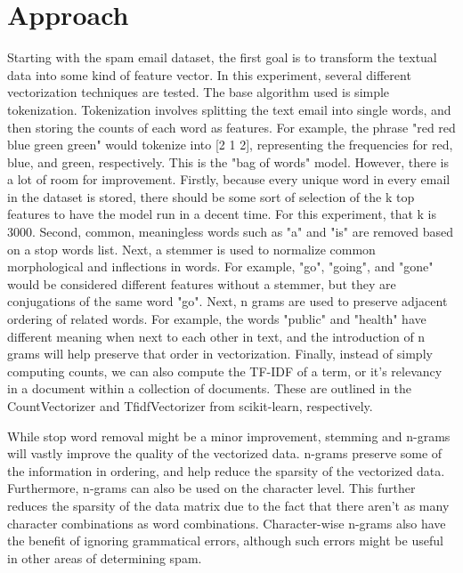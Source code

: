 \documentclass{article}
\begin{document}
\section{Approach}
\begin{paragraph}
Starting with the spam email dataset, the first goal is to transform the textual data into some kind of feature vector. In this experiment, several different vectorization techniques are tested. The base algorithm used is simple tokenization. Tokenization involves splitting the text email into single words, and then storing the counts of each word as features. For example, the phrase "red red blue green green" would tokenize into [2 1 2], representing the frequencies for red, blue, and green, respectively. This is the "bag of words" model. However, there is a lot of room for improvement. Firstly, because every unique word in every email in the dataset is stored, there should be some sort of selection of the k top features to have the model run in a decent time. For this experiment, that k is 3000. Second, common, meaningless words such as "a" and "is" are removed based on a stop words list. Next, a stemmer is used to normalize common morphological and inflections in words. For example, "go", "going", and "gone" would be considered different features without a stemmer, but they are conjugations of the same word "go". Next, n grams are used to preserve adjacent ordering of related words. For example, the words "public" and "health" have different meaning when next to each other in text, and the introduction of n grams will help preserve that order in vectorization. Finally, instead of simply computing counts, we can also compute the TF-IDF of a term, or it's relevancy in a document within a collection of documents. These are outlined in the CountVectorizer and TfidfVectorizer from scikit-learn, respectively.
\end{paragraph}
\begin{paragraph}
While stop word removal might be a minor improvement, stemming and n-grams will vastly improve the quality of the vectorized data. n-grams preserve some of the information in ordering, and help reduce the sparsity of the vectorized data. Furthermore, n-grams can also be used on the character level. This further reduces the sparsity of the data matrix due to the fact that there aren't as many character combinations as word combinations. Character-wise n-grams also have the benefit of ignoring grammatical errors, although such errors might be useful in other areas of determining spam.
\cite{10.1007/11752912_12}
\end{paragraph}
\end{document}
